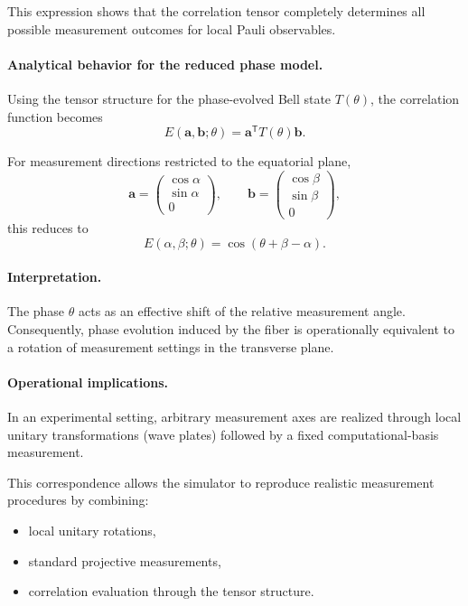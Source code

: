 \documentclass[a4paper]{article}
\begin{document}
\medskip

This expression shows that the correlation tensor completely determines all possible measurement outcomes for local Pauli observables.

\medskip

\paragraph{Analytical behavior for the reduced phase model.}

Using the tensor structure for the phase-evolved Bell state \( T(\theta) \), the correlation function becomes\[
E(\mathbf{a},\mathbf{b};\theta)
=
\mathbf{a}^{\mathsf T} T(\theta) \mathbf{b}.
\]

\medskip

For measurement directions restricted to the equatorial plane,
\[
\mathbf{a} =
\begin{pmatrix}
\cos\alpha\\
\sin\alpha\\
0
\end{pmatrix},
\qquad
\mathbf{b} =
\begin{pmatrix}
\cos\beta\\
\sin\beta\\
0
\end{pmatrix},
\]
this reduces to
\[
E(\alpha,\beta;\theta)
=
\cos(\theta + \beta - \alpha).
\]

\medskip

\paragraph{Interpretation.}

The phase \( \theta \) acts as an effective shift of the relative measurement angle. Consequently, phase evolution induced by the fiber is operationally equivalent to a rotation of measurement settings in the transverse plane.

\medskip

\paragraph{Operational implications.}

In an experimental setting, arbitrary measurement axes are realized through local unitary transformations (wave plates) followed by a fixed computational-basis measurement.

This correspondence allows the simulator to reproduce realistic measurement procedures by combining:
\begin{itemize}
\item local unitary rotations,
\item standard projective measurements,
\item correlation evaluation through the tensor structure.
\end{itemize}
\end{document}
